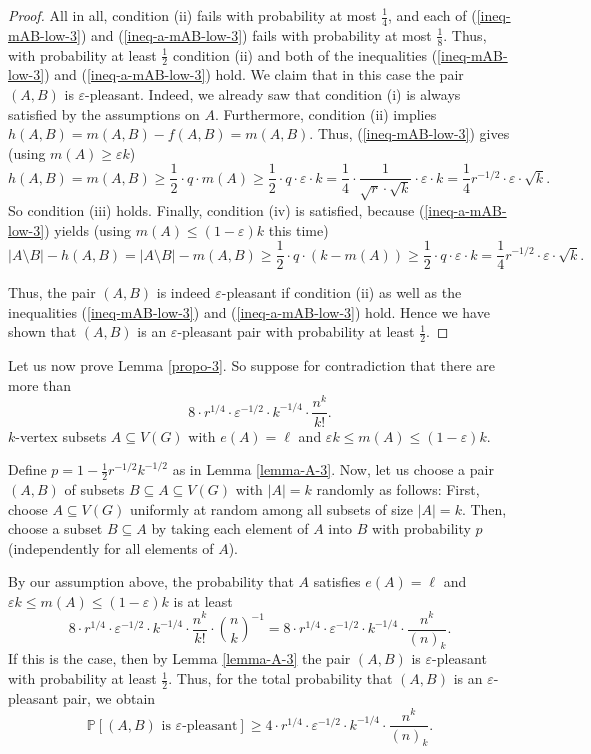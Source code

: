 \begin{proof}
All in all, condition (ii) fails with probability at most $\frac{1}{4}$, and each of (\ref{ineq-mAB-low-3}) and (\ref{ineq-a-mAB-low-3}) fails with probability at most $\frac{1}{8}$. Thus, with probability at least $\frac{1}{2}$ condition (ii) and both of the inequalities (\ref{ineq-mAB-low-3}) and (\ref{ineq-a-mAB-low-3}) hold. We claim that in this case the pair $(A,B)$ is $\varepsilon$-pleasant. Indeed, we already saw that condition (i) is always satisfied by the assumptions on $A$. Furthermore, condition (ii) implies $h(A,B)=m(A,B)-f(A,B)=m(A,B)$. Thus, (\ref{ineq-mAB-low-3}) gives (using $m(A)\geq \varepsilon k$)
\[h(A,B)=m(A,B)\geq \frac{1}{2}\cdot q \cdot m(A)\geq \frac{1}{2}\cdot q\cdot \varepsilon\cdot k=\frac{1}{4}\cdot \frac{1}{\sqrt{r}\cdot \sqrt{k}}\cdot \varepsilon\cdot k=\frac{1}{4}r^{-1/2}\cdot \varepsilon\cdot \sqrt{k}.\]
So condition (iii) holds. Finally, condition (iv) is satisfied, because (\ref{ineq-a-mAB-low-3}) yields (using $m(A)\leq (1-\varepsilon) k$ this time)
\[\vert A\setminus B\vert- h(A,B)=\vert A\setminus B\vert - m(A,B)\geq \frac{1}{2}\cdot q \cdot (k-m(A))\geq \frac{1}{2}\cdot q\cdot \varepsilon\cdot k=\frac{1}{4}r^{-1/2}\cdot \varepsilon\cdot \sqrt{k}.\]

Thus, the pair $(A,B)$ is indeed $\varepsilon$-pleasant if condition (ii) as well as the inequalities (\ref{ineq-mAB-low-3}) and (\ref{ineq-a-mAB-low-3}) hold. Hence we have shown that $(A,B)$ is an $\varepsilon$-pleasant pair with probability at least $\frac{1}{2}$.
\end{proof}

Let us now prove Lemma \ref{propo-3}. So suppose for contradiction that there are more than
\[8\cdot r^{1/4}\cdot \varepsilon^{-1/2}\cdot k^{-1/4}\cdot \frac{n^k}{k!}.\]
$k$-vertex subsets $A\subseteq V(G)$ with $e(A)=\ell$ and $\varepsilon k \leq m(A)\leq (1-\varepsilon) k$. 

Define $p=1-\frac{1}{2}r^{-1/2}k^{-1/2}$ as in Lemma \ref{lemma-A-3}. Now, let us choose a pair $(A,B)$ of subsets $B\subseteq A\subseteq V(G)$ with $\vert A\vert=k$ randomly as follows: First, choose $A\subseteq V(G)$ uniformly at random among all subsets of size $\vert A\vert=k$. Then, choose a subset $B\subseteq A$ by taking each element of $A$ into $B$ with probability $p$ (independently for all elements of $A$).

By our assumption above, the probability that $A$ satisfies $e(A)=\ell$ and $\varepsilon k \leq m(A)\leq (1-\varepsilon) k$ is at least
\[8\cdot r^{1/4}\cdot \varepsilon^{-1/2}\cdot k^{-1/4}\cdot \frac{n^k}{k!}\cdot {n\choose k}^{-1}=8\cdot r^{1/4}\cdot \varepsilon^{-1/2}\cdot k^{-1/4}\cdot \frac{n^k}{(n)_k}.\]
If this is the case, then by Lemma \ref{lemma-A-3} the pair $(A,B)$ is $\varepsilon$-pleasant with probability at least $\frac{1}{2}$. Thus, for the total probability that $(A,B)$ is an $\varepsilon$-pleasant pair, we obtain
\begin{equation}\label{ineq-ABpleasantup3}
\mathbb{P}[(A,B)\text{ is }\varepsilon\text{-pleasant}]\geq 
4\cdot r^{1/4}\cdot \varepsilon^{-1/2}\cdot k^{-1/4}\cdot\frac{n^k}{(n)_k}.
\end{equation}

